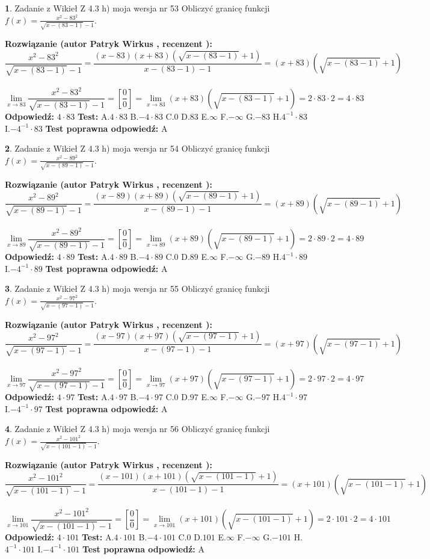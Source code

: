 \documentclass[12pt, a4paper]{article}
\theoremstyle{definition} %
\newtheorem{zad}{}
\newcommand{\zadStart}[1]{\begin{zad}#1\newline}
\newcommand{\zadStop}{\end{zad}}
\newcommand{\rozwStart}[2]{\noindent \textbf{Rozwiązanie (autor #1 , recenzent #2): }\newline}
\newcommand{\rozwStop}{\newline}
\newcommand{\odpStart}{\noindent \textbf{Odpowiedź:}\newline}
\newcommand{\odpStop}{\newline}
\newcommand{\testStart}{\noindent \textbf{Test:}\newline}
\newcommand{\testStop}{\newline}
\newcommand{\kluczStart}{\noindent \textbf{Test poprawna odpowiedź:}\newline}
\newcommand{\kluczStop}{\newline}
\begin{document}
\zadStart{Zadanie z Wikieł Z 4.3 h) moja wersja nr 53}
Obliczyć granicę funkcji $f(x)=\frac{x^{2} - 83^{2}}{\sqrt{x-(83-1)}-1}$.
\zadStop
\rozwStart{Patryk Wirkus}{}
$$\frac{x^{2} - 83^{2}}{\sqrt{x-(83-1)}-1}=\frac{(x-83)(x+83)(\sqrt{x-(83-1)}+1)}{x-(83-1)-1}=(x+83)(\sqrt{x-(83-1)}+1)$$
\\
$$\lim\limits_{x\to 83}\frac{x^{2} - 83^{2}}{\sqrt{x-(83-1)}-1}=[\frac{0}{0}]=
\lim\limits_{x\to 83}(x+83)(\sqrt{x-(83-1)}+1) = 2\cdot83 \cdot 2 = 4 \cdot 83$$
\rozwStop
\odpStart
$4\cdot83$
\odpStop
\testStart
A.$4\cdot83$
B.$-4\cdot83$
C.$0$
D.$83$
E.$\infty$
F.$-\infty$
G.$-83$
H.$4^{-1}\cdot83$
I.$-4^{-1}\cdot83$
\testStop
\kluczStart
A
\kluczStop



\zadStart{Zadanie z Wikieł Z 4.3 h) moja wersja nr 54}
Obliczyć granicę funkcji $f(x)=\frac{x^{2} - 89^{2}}{\sqrt{x-(89-1)}-1}$.
\zadStop
\rozwStart{Patryk Wirkus}{}
$$\frac{x^{2} - 89^{2}}{\sqrt{x-(89-1)}-1}=\frac{(x-89)(x+89)(\sqrt{x-(89-1)}+1)}{x-(89-1)-1}=(x+89)(\sqrt{x-(89-1)}+1)$$
\\
$$\lim\limits_{x\to 89}\frac{x^{2} - 89^{2}}{\sqrt{x-(89-1)}-1}=[\frac{0}{0}]=
\lim\limits_{x\to 89}(x+89)(\sqrt{x-(89-1)}+1) = 2\cdot89 \cdot 2 = 4 \cdot 89$$
\rozwStop
\odpStart
$4\cdot89$
\odpStop
\testStart
A.$4\cdot89$
B.$-4\cdot89$
C.$0$
D.$89$
E.$\infty$
F.$-\infty$
G.$-89$
H.$4^{-1}\cdot89$
I.$-4^{-1}\cdot89$
\testStop
\kluczStart
A
\kluczStop



\zadStart{Zadanie z Wikieł Z 4.3 h) moja wersja nr 55}
Obliczyć granicę funkcji $f(x)=\frac{x^{2} - 97^{2}}{\sqrt{x-(97-1)}-1}$.
\zadStop
\rozwStart{Patryk Wirkus}{}
$$\frac{x^{2} - 97^{2}}{\sqrt{x-(97-1)}-1}=\frac{(x-97)(x+97)(\sqrt{x-(97-1)}+1)}{x-(97-1)-1}=(x+97)(\sqrt{x-(97-1)}+1)$$
\\
$$\lim\limits_{x\to 97}\frac{x^{2} - 97^{2}}{\sqrt{x-(97-1)}-1}=[\frac{0}{0}]=
\lim\limits_{x\to 97}(x+97)(\sqrt{x-(97-1)}+1) = 2\cdot97 \cdot 2 = 4 \cdot 97$$
\rozwStop
\odpStart
$4\cdot97$
\odpStop
\testStart
A.$4\cdot97$
B.$-4\cdot97$
C.$0$
D.$97$
E.$\infty$
F.$-\infty$
G.$-97$
H.$4^{-1}\cdot97$
I.$-4^{-1}\cdot97$
\testStop
\kluczStart
A
\kluczStop



\zadStart{Zadanie z Wikieł Z 4.3 h) moja wersja nr 56}
Obliczyć granicę funkcji $f(x)=\frac{x^{2} - 101^{2}}{\sqrt{x-(101-1)}-1}$.
\zadStop
\rozwStart{Patryk Wirkus}{}
$$\frac{x^{2} - 101^{2}}{\sqrt{x-(101-1)}-1}=\frac{(x-101)(x+101)(\sqrt{x-(101-1)}+1)}{x-(101-1)-1}=(x+101)(\sqrt{x-(101-1)}+1)$$
\\
$$\lim\limits_{x\to 101}\frac{x^{2} - 101^{2}}{\sqrt{x-(101-1)}-1}=[\frac{0}{0}]=
\lim\limits_{x\to 101}(x+101)(\sqrt{x-(101-1)}+1) = 2\cdot101 \cdot 2 = 4 \cdot 101$$
\rozwStop
\odpStart
$4\cdot101$
\odpStop
\testStart
A.$4\cdot101$
B.$-4\cdot101$
C.$0$
D.$101$
E.$\infty$
F.$-\infty$
G.$-101$
H.$4^{-1}\cdot101$
I.$-4^{-1}\cdot101$
\testStop
\kluczStart
A
\kluczStop
\end{document}
